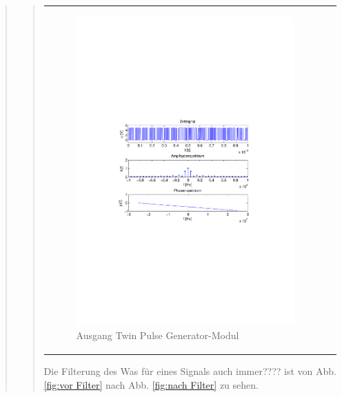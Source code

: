 \begin{quote}
\begin{quote}
\begin{center}
\begin{tabular}{ll}
                \begin{minipage}{0.67\textwidth}
                    \begin{figure}[H]
                        \label{fig:TwPu}
                        \includegraphics[scale=0.7, trim = 35mm 100mm 35mm 95mm, clip]{Bilder/f1TwPuB}
                        \caption{Ausgang Twin Pulse Generator-Modul 	}
                    \end{figure}
                \end{minipage}
            
            \end{tabular}
            \end{center}
          
          Die Filterung des Was für eines Signals auch immer???? ist von Abb.
          \ref{fig:vor Filter} nach Abb. \ref{fig:nach Filter} zu sehen.
            

\end{quote}
\end{quote}
